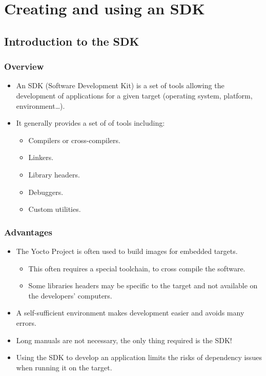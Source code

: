 \section{Creating and using an SDK}

\subsection{Introduction to the SDK}

\begin{frame}
  \frametitle{Overview}
  \begin{itemize}
    \item An SDK (Software Development Kit) is a set of tools allowing
      the development of applications for a given target (operating
      system, platform, environment\dots).
    \item It generally provides a set of of tools including:
      \begin{itemize}
        \item Compilers or cross-compilers.
        \item Linkers.
        \item Library headers.
        \item Debuggers.
        \item Custom utilities.
      \end{itemize}
  \end{itemize}
\end{frame}

\begin{frame}
  \frametitle{Advantages}
  \begin{itemize}
    \item The Yocto Project is often used to build images for embedded
      targets.
      \begin{itemize}
        \item This often requires a special toolchain, to cross
          compile the software.
        \item Some libraries headers may be specific to the target
          and not available on the developers' computers.
      \end{itemize}
    \item A self-sufficient environment makes development easier and
      avoids many errors.
    \item Long manuals are not necessary, the only thing required is
      the SDK!
    \item Using the SDK to develop an application limits the risks of
      dependency issues when running it on the target.
  \end{itemize}
\end{frame}

